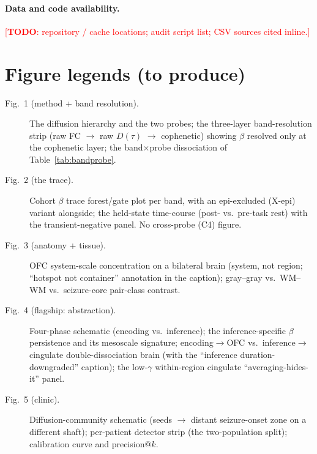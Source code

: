 \documentclass[11pt]{article}
\newcommand{\TODO}[1]{\textcolor{red}{[\textbf{TODO}: #1]}}
\newcommand{\tab}[1]{Table~\ref{#1}}
\begin{document}
\paragraph{Data and code availability.}
\TODO{repository / cache locations; audit script list; CSV sources cited inline.}

\section*{Figure legends (to produce)}
\begin{description}
\item[Fig.~1 (method + band resolution).] The diffusion hierarchy and the two
  probes; the three-layer band-resolution strip (raw FC $\rightarrow$ raw
  $D(\tau)$ $\rightarrow$ cophenetic) showing $\beta$ resolved only at the
  cophenetic layer; the band$\times$probe dissociation of \tab{tab:bandprobe}.
\item[Fig.~2 (the trace).] Cohort $\beta$ trace forest/gate plot per band, with an
  epi-excluded (X-epi) variant alongside; the held-state time-course
  (post- vs.\ pre-task rest) with the transient-negative panel. No cross-probe
  (C4) figure.
\item[Fig.~3 (anatomy + tissue).] OFC system-scale concentration on a bilateral
  brain (system, not region; ``hotspot not container'' annotation in the caption);
  gray--gray vs.\ WM--WM vs.\ seizure-core pair-class contrast.
\item[Fig.~4 (flagship: abstraction).] Four-phase schematic (encoding vs.\
  inference); the inference-specific $\beta$ persistence and its mesoscale
  signature; encoding$\rightarrow$OFC vs.\ inference$\rightarrow$cingulate
  double-dissociation brain (with the ``inference duration-downgraded'' caption);
  the low-$\gamma$ within-region cingulate ``averaging-hides-it'' panel.
\item[Fig.~5 (clinic).] Diffusion-community schematic (seeds $\rightarrow$ distant
  seizure-onset zone on a different shaft); per-patient detector strip (the
  two-population split); calibration curve and precision@$k$.
\end{description}
\end{document}
